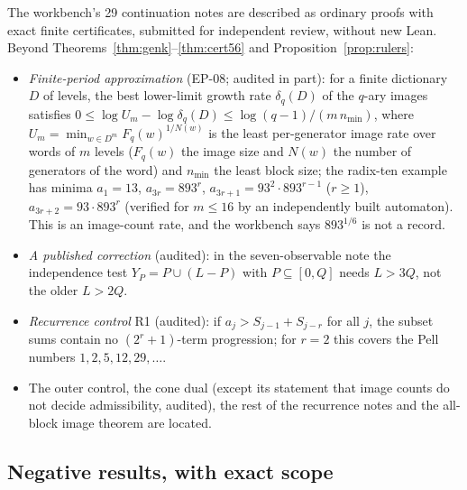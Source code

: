 The workbench's 29 continuation notes are described as ordinary proofs with exact finite certificates, submitted for independent review, without new Lean. Beyond Theorems~\ref{thm:genk}--\ref{thm:cert56} and Proposition~\ref{prop:rulers}:
\begin{itemize}
\item \emph{Finite-period approximation} (EP-08; audited in part): for a finite dictionary $D$ of levels, the best lower-limit growth rate $\delta_q(D)$ of the $q$-ary images satisfies $0\le\log U_m-\log\delta_q(D)\le\log(q-1)/(m\,n_{\min})$, where $U_m=\min_{w\in D^m}F_q(w)^{1/N(w)}$ is the least per-generator image rate over words of $m$ levels ($F_q(w)$ the image size and $N(w)$ the number of generators of the word) and $n_{\min}$ the least block size; the radix-ten example has minima $a_1=13$, $a_{3r}=893^r$, $a_{3r+1}=93^2\cdot893^{r-1}$ ($r\ge1$), $a_{3r+2}=93\cdot893^r$ (verified for $m\le16$ by an independently built automaton). This is an image-count rate, and the workbench says $893^{1/6}$ is not a record.
\item \emph{A published correction} (audited): in the seven-observable note the independence test $Y_P=P\cup(L-P)$ with $P\subseteq[0,Q]$ needs $L>3Q$, not the older $L>2Q$.
\item \emph{Recurrence control} R1 (audited): if $a_j>S_{j-1}+S_{j-r}$ for all $j$, the subset sums contain no $(2^r+1)$-term progression; for $r=2$ this covers the Pell numbers $1,2,5,12,29,\dots$.
\item The outer control, the cone dual (except its statement that image counts do not decide admissibility, audited), the rest of the recurrence notes and the all-block image theorem are located.
\end{itemize}

\subsection{Negative results, with exact scope}

